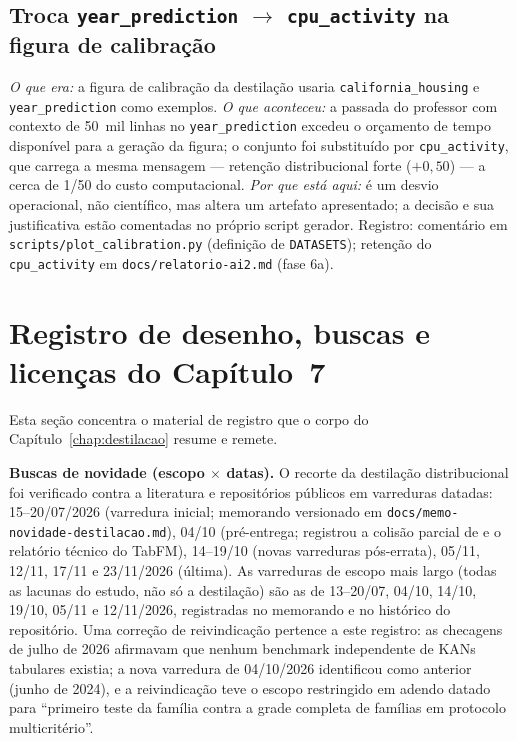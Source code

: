 \subsection[Troca de conjunto na figura de
calibração]{Troca \texttt{year\_\allowbreak prediction} $\to$
\texttt{cpu\_activity} na figura de calibração}
\emph{O que era:} a figura de calibração da destilação usaria
\texttt{california\_\allowbreak housing} e \texttt{year\_\allowbreak prediction} como
exemplos. \emph{O que aconteceu:} a passada do professor com contexto de
50~mil linhas no \texttt{year\_\allowbreak prediction} excedeu o
orçamento de tempo disponível para a geração da figura; o conjunto foi
substituído por
\texttt{cpu\_activity}, que carrega a mesma mensagem --- retenção
distribucional forte ($+0{,}50$) --- a cerca de 1/50 do custo
computacional. \emph{Por que está aqui:} é um desvio operacional, não
científico, mas altera um artefato apresentado; a decisão e sua
justificativa estão comentadas no próprio script gerador. Registro:
comentário em \texttt{scripts/\allowbreak plot\_\allowbreak calibration.\allowbreak py} (definição de
\texttt{DATASETS}); retenção do \texttt{cpu\_activity} em
\texttt{docs/\allowbreak relatorio-\allowbreak ai2.\allowbreak md} (fase 6a).

\section{Registro de desenho, buscas e licenças do Capítulo~7}
\label{sec:app-registro-cap7}

Esta seção concentra o material de registro que o corpo do
Capítulo~\ref{chap:destilacao} resume e remete.

\textbf{Buscas de novidade (escopo $\times$ datas).} O recorte da
destilação distribucional foi verificado contra a literatura e
repositórios públicos em varreduras datadas: 15--20/07/2026 (varredura
inicial; memorando versionado em
\texttt{docs/\allowbreak memo-\allowbreak novidade-\allowbreak destilacao.md}),
04/10 (pré-entrega; registrou a colisão parcial de
\citealp{jeong2026} e o relatório técnico do TabFM), 14--19/10
(novas varreduras pós-errata), 05/11, 12/11, 17/11 e 23/11/2026 (última).
As varreduras de escopo mais largo (todas as lacunas do estudo, não só
a destilação) são as de 13--20/07, 04/10, 14/10, 19/10, 05/11 e
12/11/2026, registradas no memorando e no histórico do repositório.
Uma correção de reivindicação pertence a este registro: as checagens
de julho de 2026 afirmavam que nenhum benchmark independente de KANs
tabulares existia; a nova varredura de 04/10/2026 identificou
\citet{poeta2024} como anterior (junho de 2024), e a reivindicação
teve o escopo restringido em adendo datado para ``primeiro teste da família
contra a grade completa de famílias em protocolo multicritério''.

